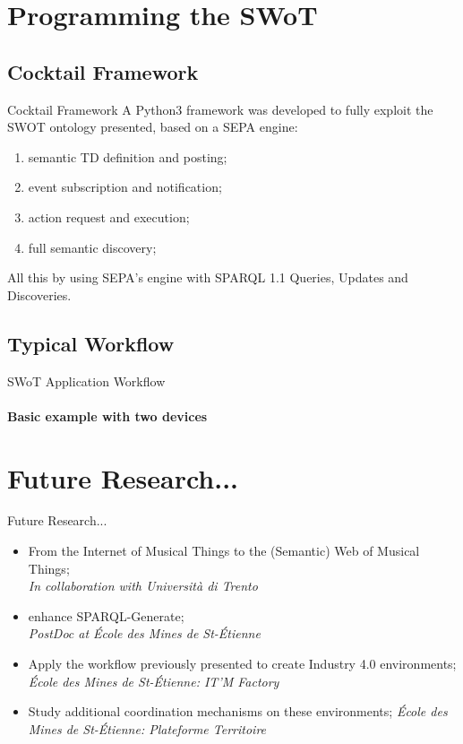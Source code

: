 \documentclass{beamer}
\begin{document}
\section{Programming the SWoT}
\subsection{Cocktail Framework}
\begin{frame}{Cocktail Framework}
A Python3 framework was developed to fully exploit the SWOT ontology presented, based on a SEPA engine:
\begin{enumerate}
    \item<1-> semantic TD definition and posting;
    \item<2-> event subscription and notification;
    \item<3-> action request and execution;
    \item<4-> full semantic discovery;
\end{enumerate}
All this by using SEPA's engine with SPARQL 1.1 Queries, Updates and Discoveries.
\end{frame}

\subsection{Typical Workflow}
\begin{frame}{SWoT Application Workflow}
\framesubtitle{Basic example with two devices}

\end{frame}

\section{Future Research...}
\begin{frame}{Future Research...}
\begin{itemize}
    \item<1-> From the Internet of Musical Things to the (Semantic) Web of Musical Things; \\ \textit{\footnotesize{In collaboration with Università di Trento}}
    \item<2-> enhance SPARQL-Generate; \\
    \textit{\footnotesize{PostDoc at \'{E}cole des Mines de St-\'{E}tienne}}
    \item<3-> Apply the workflow previously presented to create Industry 4.0 environments;
    \textit{\footnotesize{\'{E}cole des Mines de St-\'{E}tienne}: IT'M Factory}
    \item<4-> Study additional coordination mechanisms on these environments;
    \textit{\footnotesize{\'{E}cole des Mines de St-\'{E}tienne}: Plateforme Territoire}
\end{itemize}
\end{frame}
\end{document}
